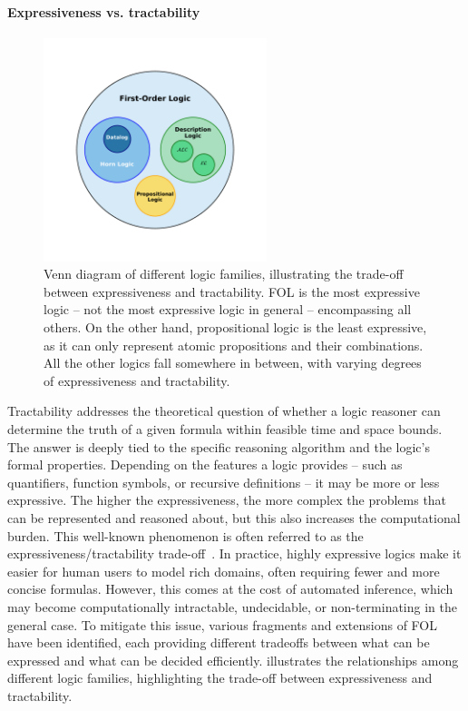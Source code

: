\paragraph{Expressiveness vs. tractability}
%
\begin{figure}
    \centering
    \includegraphics[width=0.58\textwidth]{figures/venn_diagram_logics}
    \caption[Venn diagram of different logic families]{
        Venn diagram of different logic families, illustrating the trade-off between expressiveness and tractability.
        \Gls{FOL} is the most expressive logic -- not the most expressive logic in general -- encompassing all others.
        On the other hand, propositional logic is the least expressive, as it can only represent atomic propositions and their combinations.
        All the other logics fall somewhere in between, with varying degrees of expressiveness and tractability.
    }
    \label{fig:venn-diagram-logics}
\end{figure}

%
Tractability addresses the theoretical question of whether a logic reasoner can determine the truth of a given formula within feasible time and space bounds.
%
The answer is deeply tied to the specific reasoning algorithm and the logic's formal properties.
%
Depending on the features a logic provides -- such as quantifiers, function symbols, or recursive definitions -- it may be more or less expressive.
%
The higher the expressiveness, the more complex the problems that can be represented and reasoned about, but this also increases the computational burden.
%
This well-known phenomenon is often referred to as the expressiveness/tractability trade-off~\cite{DBLP:journals/jlp/CadoliS93,BRACHMAN2004327,DBLP:journals/ci/LevesqueB87}.
%
In practice, highly expressive logics make it easier for human users to model rich domains, often requiring fewer and more concise formulas.
%
However, this comes at the cost of automated inference, which may become computationally intractable, undecidable, or non-terminating in the general case.
%
To mitigate this issue, various fragments and extensions of \gls{FOL} have been identified, each providing different tradeoffs between what can be expressed and what can be decided efficiently.
%
 illustrates the relationships among different logic families, highlighting the trade-off between expressiveness and tractability.



